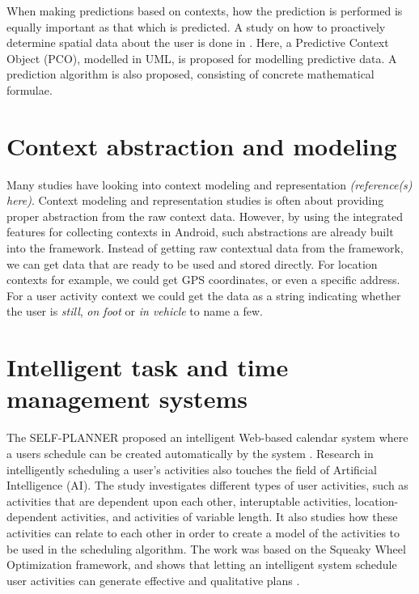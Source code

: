 When making predictions based on contexts, how the prediction is performed is equally important as that which is predicted. A study on how to proactively determine spatial data about the user is done in \cite{anagnostopoulos2005prediction}. Here, a Predictive Context Object (PCO), modelled in UML, is proposed for modelling predictive data. A prediction algorithm is also proposed, consisting of concrete mathematical formulae.



\section{Context abstraction and modeling}

Many studies have looking into context modeling and representation \emph{\color{red}(reference(s) here)}. Context modeling and representation studies is often about providing proper abstraction from the raw context data. However, by using the integrated features for collecting contexts in Android, such abstractions are already built into the framework. Instead of getting raw contextual data from the framework, we can get data that are ready to be used and stored directly. For location contexts for example, we could get GPS coordinates, or even a specific address. For a user activity context we could get the data as a string indicating whether the user is \emph{still}, \emph{on foot} or \emph{in vehicle} to name a few. 

\section{Intelligent task and time management systems}
The SELF-PLANNER \cite{refanidis2011deployment} proposed an intelligent Web-based calendar system where a users schedule can be created automatically by the system \cite{refanidis2010constraint}. Research in intelligently scheduling a user's activities also touches the field of Artificial Intelligence (AI). The study investigates different types of user activities, such as activities that are dependent upon each other, interuptable activities, location-dependent activities, and activities of variable length. It also studies how these activities can relate to each other in order to create a model of the activities to be used in the scheduling algorithm. The work was based on the Squeaky Wheel Optimization framework, and shows that letting an intelligent system schedule user activities can generate effective and qualitative plans \cite{refanidis2010constraint}.

